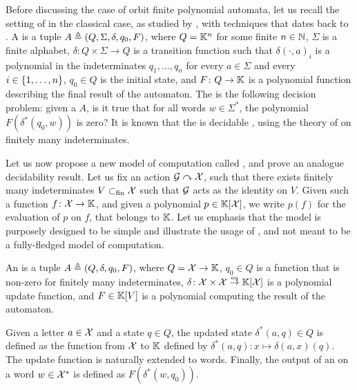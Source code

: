 \AP Before discussing the case of orbit finite polynomial automata, let us
recall the setting of  in the classical case, as
studied by \cite{BEDUSHWO17}, with techniques that dates back to
\cite{MULSEI02}. A  is a tuple $A \triangleq (Q,
\Sigma, \delta, q_0, F)$, where $Q = \mathbb{K}^n$ for some finite $n \in \mathbb{N}$, $\Sigma$
is a finite alphabet, $\delta \colon Q \times \Sigma \to Q$ is a transition
function such that $\delta(\cdot,a)_i$ is a polynomial in the indeterminates
$q_1, \dots, q_n$ for every $a \in \Sigma$ and every $i \in \{ 1, \dots, n \}$,
$q_0 \in Q$ is the initial state, and $F \colon Q \to \mathbb{K}$ is a polynomial
function describing the final result of the automaton. The  is the following decision problem: given a
 $A$, is it true that for all words $w \in \Sigma^*$,
the polynomial $F(\delta^*(q_0, w))$ is zero? It is known that the  is decidable \cite{BEDUSHWO17}, using the
theory of  on finitely many indeterminates. 


\newcommand{\toequiv}{\stackrel{\text{\tiny{eq}}}{\to}}

\AP Let us now propose a new model of computation called , and prove an analogue decidability result. Let us fix an
 action $\mathcal{G} \curvearrowright \mathcal{X}$, such that there
exists finitely many indeterminates $V \subset_{\text{fin}} \mathcal{X}$ such that $\mathcal{G}$ acts
as the identity on $V$. Given such a function $f \colon \mathcal{X} \to \mathbb{K}$, and
given a polynomial $p \in \mathbb{K}[\mathcal{X}]$, we write $p(f)$ for the
evaluation of $p$ on $f$, that belongs to $\mathbb{K}$. Let us emphasis that the model
is purposely designed to be simple and illustrate the usage of , and not meant to be a fully-fledged model of computation.

\begin{definition}
  \label{def:orbit-finite-polynomial-automaton}
  An  is a tuple $A \triangleq (Q, \delta, q_0, F)$, where $Q =
  \mathcal{X} \to \mathbb{K}$, $q_0 \in Q$ is a function that is non-zero for finitely
  many indeterminates, $\delta \colon
  \Indets \times \Indets \toequiv \poly{\K}{\Indets}$ 
  is a
  polynomial update function, and $F \in \mathbb{K}[V]$ is a polynomial 
  computing the result of the automaton. 

  Given a letter $a \in \mathcal{X}$ and a
  state $q \in Q$, the updated state $\delta^*(a,q)  \in Q$ is defined as the function from
  $\mathcal{X}$ to $\mathbb{K}$ defined by $\delta^*(a,q) \colon x \mapsto \delta(a,x)( q )$.
  The update function is naturally extended to words. Finally, the
  output of an  on a word $w \in \mathcal{X}^*$
  is defined as $F(\delta^*(w,q_0))$.
\end{definition}


